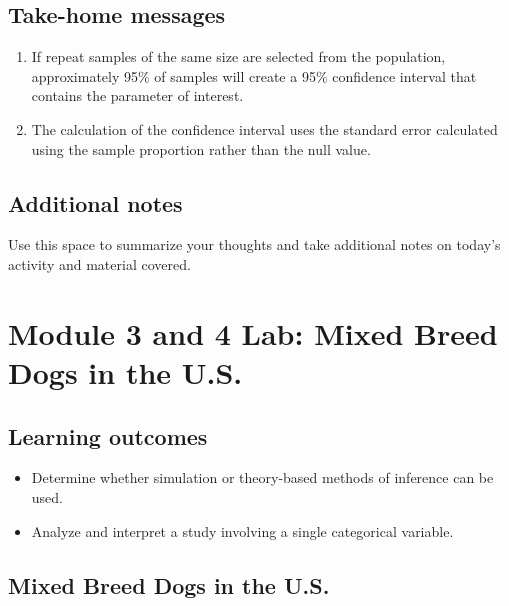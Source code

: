 \documentclass[
]{report}
\begin{document}
\subsection{Take-home messages}\label{take-home-messages-7}

\begin{enumerate}
\def\labelenumi{\arabic{enumi}.}
\item
  If repeat samples of the same size are selected from the population, approximately 95\% of samples will create a 95\% confidence interval that contains the parameter of interest.
\item
  The calculation of the confidence interval uses the standard error calculated using the sample proportion rather than the null value.
\end{enumerate}

\subsection{Additional notes}\label{additional-notes-7}

Use this space to summarize your thoughts and take additional notes on today's activity and material covered.

\newpage

\section{Module 3 and 4 Lab: Mixed Breed Dogs in the U.S.}\label{module-3-and-4-lab-mixed-breed-dogs-in-the-u.s.}


\subsection{Learning outcomes}\label{learning-outcomes-8}

\begin{itemize}
\item
  Determine whether simulation or theory-based methods of inference can be used.
\item
  Analyze and interpret a study involving a single categorical variable.
\end{itemize}

\subsection{Mixed Breed Dogs in the U.S.}\label{mixed-breed-dogs-in-the-u.s.}
\end{document}
